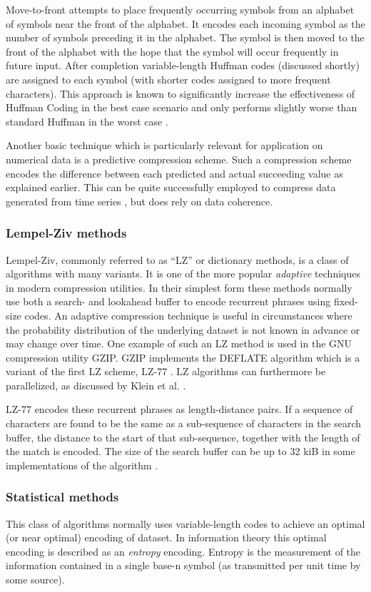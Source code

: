 Move-to-front attempts to place frequently occurring symbols from an alphabet of symbols near the front of the alphabet. It encodes each incoming symbol as the number of 
symbols preceding it in the alphabet. The symbol is then moved to the front of the alphabet with the hope that the symbol will occur frequently in future input. After completion 
variable-length Huffman codes (discussed shortly) are assigned to each symbol (with shorter codes assigned to more frequent characters). This approach is known to significantly increase 
the effectiveness of Huffman Coding in the best case scenario and only performs slightly worse than standard Huffman in the worst case \cite[ch. 1]{salomon2004data}. 

Another basic technique which is particularly relevant for application on numerical data is a predictive compression scheme. Such a compression scheme encodes the 
difference between each predicted and actual succeeding value as explained earlier. This can be quite successfully employed to compress data 
generated from time series \cite{engelson2000lossless}, but does rely on data coherence.
\subsubsection{Lempel-Ziv methods}
Lempel-Ziv, commonly referred to as “LZ” or dictionary methods, is a class of algorithms with many variants. It is one of the more popular \textit{adaptive} techniques 
in modern compression utilities. In their simplest form these methods normally use both a search- and lookahead buffer to encode recurrent phrases using fixed-size codes. An 
adaptive compression technique is useful in circumstances where the probability distribution of the underlying dataset is not known in advance or may change over time. 
One example of such an LZ method is used in the GNU compression utility GZIP. GZIP implements the DEFLATE algorithm which is a variant of the first LZ scheme, LZ-77 
\cite[ch. 3]{salomon2004data}. LZ algorithms can furthermore be parallelized, as discussed by Klein et al. \cite{klein2005parallel}. 

LZ-77 encodes these recurrent phrases as length-distance pairs. If a sequence of characters are found to be the same as a sub-sequence of characters in the search buffer, the 
distance to the start of that sub-sequence, together with the length of the match is encoded. The size of the search buffer can be up to 32 kiB in some implementations of the 
algorithm \cite[ch. 3]{salomon2004data}.
\subsubsection{Statistical methods}
This class of algorithms normally uses variable-length codes to achieve an optimal (or near optimal) encoding of dataset. In information theory this optimal encoding is 
described as an \textit{entropy} encoding. Entropy is the measurement of the information contained in a single base-n symbol (as transmitted per unit time by some source).

